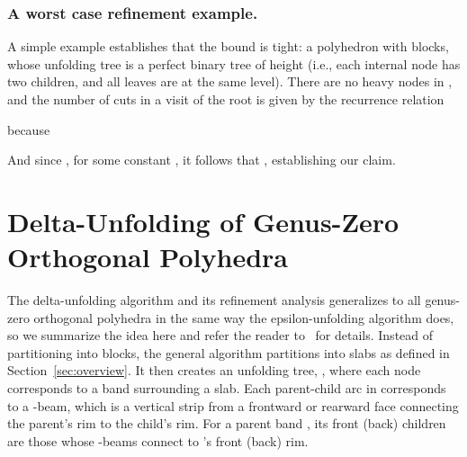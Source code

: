 \documentclass[11pt]{article}
\begin{document}
\subsubsection{A worst case refinement example.}
A simple example establishes that the bound  is tight: a
polyhedron with  blocks,
whose unfolding tree  is a perfect
binary tree of height  (i.e., each internal node has two children, and all
leaves are at the same level).
There are no heavy nodes in , and the number of cuts in a visit of
the root is given by the recurrence relation

because

And since , for some constant , it follows that ,
establishing our claim.

\section{Delta-Unfolding of Genus-Zero Orthogonal Polyhedra}
\label{Delta-Unfolding of Genus-Zero Orthogonal Polyhedra}

The delta-unfolding algorithm and its refinement analysis
generalizes to all genus-zero orthogonal polyhedra in the same
way the epsilon-unfolding algorithm does, so we summarize the idea here and refer the
reader to~\cite{Damian-Flatland-O'Rourke-2007-epsilon} for details. Instead of partitioning  into blocks, the general algorithm
partitions  into slabs as defined in Section~\ref{sec:overview}.
It then creates an unfolding tree, , where each node corresponds to a band surrounding a slab.
Each parent-child arc in  corresponds to a -beam, which is a vertical strip from a frontward or rearward face connecting the parent's rim to the child's rim.
For a parent band , its front (back) children are those
whose -beams connect to 's front (back) rim.
\end{document}
